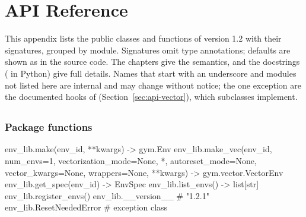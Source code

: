 \chapter{API Reference}\label{app:api}
\begingroup\setlength{\emergencystretch}{3em}%

This appendix lists the public classes and functions of version 1.2 with their
signatures, grouped by module. Signatures omit type annotations; defaults are
shown as in the source code. The chapters give the semantics, and the
docstrings ( in Python) give full details. Names that start
with an underscore and modules not listed here are internal and may change
without notice; the one exception are the documented hooks of
 (Section~\ref{sec:api-vector}), which subclasses
implement.

\section{\texorpdfstring{}{env\_lib}}\label{sec:api-envlib}

\subsection{Package functions}

\begin{pycode}
env_lib.make(env_id, **kwargs) -> gym.Env
env_lib.make_vec(env_id, num_envs=1, vectorization_mode=None, *,
                 autoreset_mode=None, vector_kwargs=None, wrappers=None,
                 **kwargs) -> gym.vector.VectorEnv
env_lib.get_spec(env_id) -> EnvSpec
env_lib.list_envs() -> list[str]
env_lib.register_envs()
env_lib.__version__                       # "1.2.1"
env_lib.ResetNeededError                  # exception class
\end{pycode}

